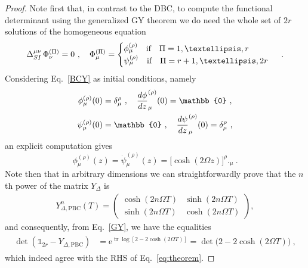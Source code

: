 \documentclass[10pt,a4paper]{amsart}
\newcommand{\tr}{\operatorname{tr}}
\begin{document}
\begin{proof}
Note first that, in contrast to the DBC, to compute the functional determinant using the generalized GY theorem we do need the whole set of $2r$ solutions of the homogeneous equation
\begin{equation}
\Delta_{\rm SI}^{\mu\nu} \, \Phi_\nu^{(\Pi)}=0\ , \quad \Phi^{(\Pi)}_\mu=\begin{cases}
 \phi_\mu^{(\rho)} \quad \text{if} \quad \Pi=1,\dots,r \\
 \psi_\mu^{(\rho)} \quad \text{if} \quad \Pi=r+1,\dots,2r
\end{cases}\ .
\end{equation}
 Considering Eq.~\eqref{BCY} as initial conditions, namely 
\begin{align}
\phi_\mu^{(\rho)}(0)&=\delta^\rho_\mu\ , \quad \frac{{\rm d}\phi}{{\rm d}z}_\mu^{(\rho)}(0)=\mathbb{0}\ ,
\\
\psi_\mu^{(\rho)}(0)&=\mathbb{0}\ , \quad \frac{{\rm d}\psi}{{\rm d}z}_\mu^{(\rho)}(0)=\delta^\rho_\mu\ ,
\end{align}
an explicit computation gives
\begin{equation}
\phi_\mu^{(\rho)}(z)=\dot{\psi}_\mu^{(\rho)}(z)=\Big[\cosh(2\Omega z)\Big]^\rho{}\Big._\mu\ .
\end{equation}
Note then that in arbitrary dimensions we can straightforwardly prove that the $n$th power of the matrix $Y_\Delta$ is
\begin{align}
 Y^n_{\Delta, \mathrm{PBC}} (T)= \begin{pmatrix}
 \cosh(2n\Omega T) & \sinh(2n\Omega T)
 \\
 \sinh(2n\Omega T) & \cosh(2n\Omega T)
 \end{pmatrix},
\end{align}
and consequently, from Eq.~\eqref{GY}, we have the equalities
\begin{align}
 \begin{split}
 \det(\mathbb{1}_{2r} - Y_{\Delta, \mathrm{PBC}}) 
 &= \mathrm{e}^{\tr \log [2-2 \cosh(2\Omega T)]}
 = \det \big(2-2\cosh(2\Omega T)\big) \ ,
 \end{split}
\end{align}
which indeed agree with the RHS of Eq.~\eqref{eq:theorem}. 
\end{proof}
\end{document}
